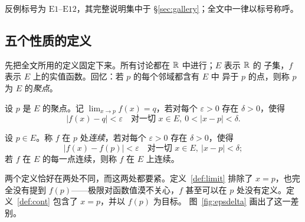反例标号为 $\mathrm{E}1$--$\mathrm{E}12$，其完整说明集中于
\S\ref{sec:gallery}；全文中一律以标号称呼。

\subsection{五个性质的定义}
\label{sec:defs}

先把全文所用的定义固定下来。所有讨论都在 $\mathbb{R}$ 中进行；$E$ 表示 $\mathbb{R}$ 的
子集，$f$ 表示 $E$ 上的实值函数。回忆：若 $p$ 的每个邻域都含有 $E$ 中
异于 $p$ 的点，则称 $p$ 为 $E$ 的\emph{聚点}。

\begin{definition}[极限]\label{def:limit}
设 $p$ 是 $E$ 的聚点。记 $\lim_{x\to p} f(x) = q$，若对每个
$\varepsilon>0$ 存在 $\delta>0$，使得
\[ |f(x)-q| < \varepsilon \quad\text{对一切 } x \in E,\
   0 < |x-p| < \delta . \]
\end{definition}

\begin{definition}[连续]\label{def:cont}
设 $p \in E$。称 $f$ 在 $p$ 处\emph{连续}，若对每个 $\varepsilon>0$
存在 $\delta>0$，使得
\[ |f(x)-f(p)| < \varepsilon \quad\text{对一切 } x \in E,\
   |x-p| < \delta ; \]
若 $f$ 在 $E$ 的每一点连续，则称 $f$ 在 $E$ 上连续。
\end{definition}

两个定义恰好在两处不同，而这两处都要紧。定义~\ref{def:limit} 排除了
$x=p$，也完全没有提到 $f(p)$——极限对函数值漠不关心，$f$ 甚至可以在
$p$ 处没有定义。定义~\ref{def:cont} 包含了 $x=p$，并以 $f(p)$ 为目标。
图~\ref{fig:epsdelta} 画出了这一差别。

